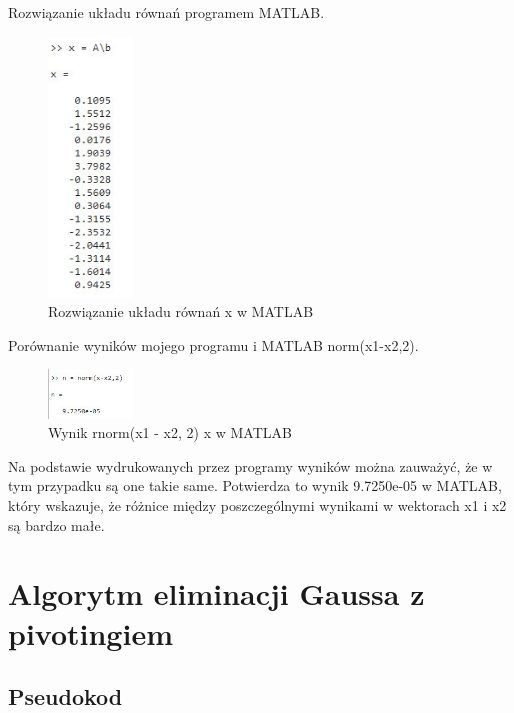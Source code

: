 \documentclass[9pt]{article}
\begin{document}
Rozwiązanie układu równań programem MATLAB.

\begin{figure}[h]
  \centering
  \includegraphics[width=0.2\textwidth]{result_x_matlab_1.jpg}
  \caption{Rozwiązanie układu równań x w MATLAB}
\end{figure}

Porównanie wyników mojego programu i MATLAB norm(x1-x2,2).

\begin{figure}[h]
  \centering
  \includegraphics[width=0.2\textwidth]{results_x_comparison_1.jpg}
  \caption{Wynik rnorm(x1 - x2, 2) x w MATLAB}
\end{figure}

Na podstawie wydrukowanych przez programy wyników można zauważyć, że w tym przypadku są one takie same. Potwierdza to wynik 9.7250e-05 w MATLAB, który wskazuje, że różnice między poszczególnymi wynikami w wektorach x1 i x2 są bardzo małe.

\section{Algorytm eliminacji Gaussa z pivotingiem}

\subsection{Pseudokod}
\end{document}
